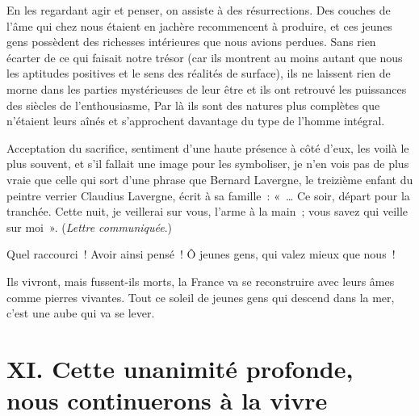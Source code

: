 \documentclass[french,twoside]{book} %
\newcommand\chapteropen{} %
\newcommand\chapterclose{} %
\begin{document}
En les regardant agir et penser, on assiste à des résurrections. Des couches de l’âme qui chez nous étaient en jachère recommencent à produire, et ces jeunes gens possèdent des richesses intérieures que nous avions perdues. Sans rien écarter de ce qui faisait notre trésor (car ils montrent au moins autant que nous les aptitudes positives et le sens des réalités de surface), ils ne laissent rien de morne dans les parties mystérieuses de leur être et ils ont retrouvé les puissances des siècles de l’enthousiasme, Par là ils sont des natures plus complètes que n’étaient leurs aînés et s’approchent davantage du type de l’homme intégral.‌\par
Acceptation du sacrifice, sentiment d’une haute présence à côté d’eux, les voilà le plus souvent, et s’il fallait une image pour les symboliser, je n’en vois pas de plus vraie que celle qui sort d’une phrase que Bernard Lavergne, le treizième enfant du peintre verrier Claudius Lavergne, écrit à sa famille : « … Ce soir, départ pour la tranchée. Cette nuit, je veillerai sur vous, l’arme à la main ; vous savez qui veille sur moi ». ({\itshape Lettre communiquée}.)‌\par
Quel raccourci ! Avoir ainsi pensé ! Ô jeunes gens, qui valez mieux que nous !‌\par
Ils vivront, mais fussent-ils morts, la France va se reconstruire avec leurs âmes comme pierres vivantes. Tout ce soleil de jeunes gens qui descend dans la mer, c’est une aube qui va se lever.‌
\chapterclose


\chapteropen
\chapter[{XI. Cette unanimité profonde, nous continuerons à la vivre‌}]{XI. Cette unanimité profonde, nous continuerons à la vivre‌}\renewcommand{\leftmark}{XI. Cette unanimité profonde, nous continuerons à la vivre‌}
\end{document}
